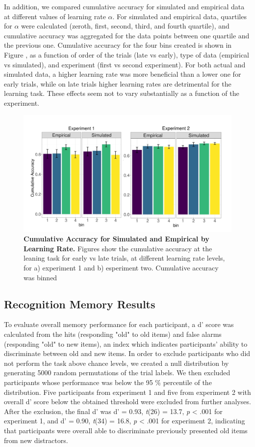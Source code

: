 \documentclass[a4paper,12pt]{article} 			%
\begin{document}
In addition, we compared cumulative accuracy for simulated and empirical data at different values of learning rate $\alpha$. For simulated and empirical data, quartiles for $\alpha$ were calculated (zeroth, first, second, third, and fourth quartile), and cumulative accuracy was aggregated for the data points between one quartile and the previous one. Cumulative accuracy for the four bins created is shown in Figure \label{fig:binAll}, as a function of order of the trials (late vs early), type of data (empirical vs simulated), and experiment (first vs second experiment). For both actual and simulated data, a higher learning rate was more beneficial than a lower one for early trials, while on late trials higher learning rates are detrimental for the learning task. These effects seem not to vary substantially as a function of the experiment. 

\begin{figure}[ht!]
\centerline
{\includegraphics[width=1.5\textwidth]{figures/bin.plot.all.jpg}}
\caption{\textbf{Cumulative Accuracy for Simulated and Empirical by Learning Rate.} Figures show the cumulative accuracy at the leaning task for early vs late trials, at different learning rate levels, for a) experiment 1 and b) esperiment two. Cumulative accuracy was binned  }
\label{fig:binAll}
\end{figure}

\subsection{Recognition Memory Results}
To evaluate overall memory performance for each participant, a d' score was calculated from the hits (responding "old" to old items) and false alarms (responding "old" to new items), an index which indicates participants' ability to discriminate between old and new items. In order to exclude participants who did not perform the task above chance levels, we created a null distribution by generating 5000 random permutations of the trial labels. We then excluded participants whose performance was below the 95 \% percentile of the distribution. Five participants from experiment 1 and five from experiment 2 with overall d' score below the obtained threshold were excluded from further analyses. After the exclusion, the final d' was d' = 0.93,  \textit{t}(26) = 13.7, \textit{p} < .001 for experiment 1, and d’ = 0.90,  \textit{t}(34) = 16.8, \textit{p} < .001 for experiment 2, indicating that participants were overall able to discriminate previously presented old items from new distractors. 
\end{document}
